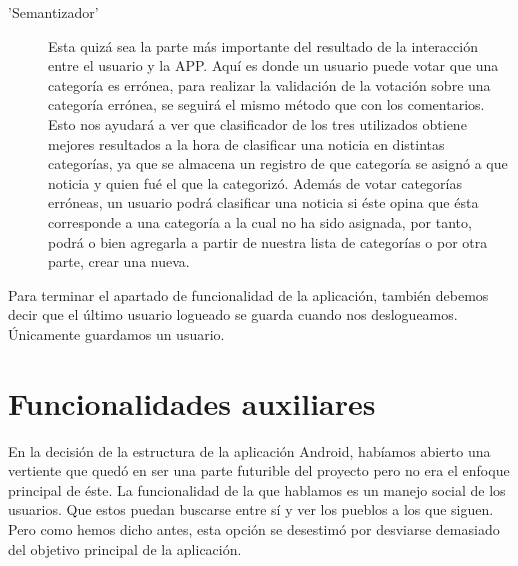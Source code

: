 \begin{description}
\begin{description}
		\item['Semantizador']
			Esta quizá sea la parte más importante del resultado de la interacción entre el usuario y la APP. Aquí es donde un usuario puede votar que una categoría es errónea, para realizar la validación de la votación sobre una categoría errónea, se seguirá el mismo método que con los comentarios. Esto nos ayudará a ver que clasificador de los tres utilizados obtiene mejores resultados a la hora de clasificar una noticia en distintas categorías, ya que se almacena un registro de que categoría se asignó a que noticia y quien fué el que la categorizó. Además de votar categorías erróneas, un usuario podrá clasificar una noticia si éste opina que ésta corresponde a una categoría a la cual no ha sido asignada, por tanto, podrá o bien agregarla a partir de nuestra lista de categorías o por otra parte, crear una nueva.
			
	\end{description}

\end{description}
Para terminar el apartado de funcionalidad de la aplicación, también debemos decir que el último usuario logueado se guarda cuando nos deslogueamos. Únicamente guardamos un usuario.

\section{Funcionalidades auxiliares}
En la decisión de la estructura de la aplicación Android, habíamos abierto una vertiente que quedó en ser una parte futurible del proyecto pero no era el enfoque principal de éste. La funcionalidad de la que hablamos es un manejo social de los usuarios. Que estos puedan buscarse entre sí y ver los pueblos a los que siguen. Pero como hemos dicho antes, esta opción se desestimó por desviarse demasiado del objetivo principal de la aplicación.	


